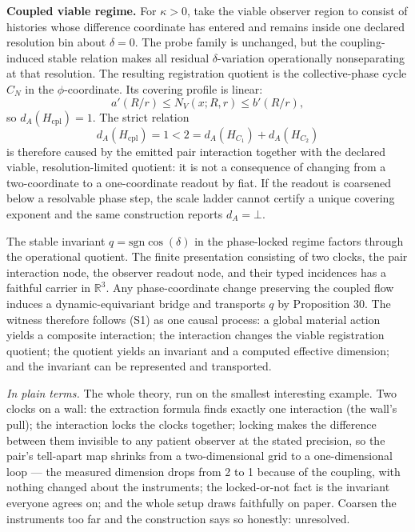 \documentclass[11pt]{article}
\theoremstyle{definition}
\newcommand{\plainterms}{\emph{In plain terms.}}
\begin{document}
\noindent\textbf{Coupled viable regime.} For $\kappa > 0$, take the viable observer region to consist of histories whose difference coordinate has entered and remains inside one declared resolution bin about $\delta = 0$. The probe family is unchanged, but the coupling-induced stable relation makes all residual $\delta$-variation operationally nonseparating at that resolution. The resulting registration quotient is the collective-phase cycle $C_N$ in the $\phi$-coordinate. Its covering profile is linear:
\begin{equation}
a'(R/r) \leq N_V(x; R, r) \leq b'(R/r), \tag{S27}
\end{equation}
so $d_A(H_{\mathrm{cpl}}) = 1$. The strict relation
\begin{equation}
d_A(H_{\mathrm{cpl}}) = 1 < 2 = d_A(H_{C_1}) + d_A(H_{C_2}) \tag{S28}
\end{equation}
is therefore caused by the emitted pair interaction together with the declared viable, resolution-limited quotient: it is not a consequence of changing from a two-coordinate to a one-coordinate readout by fiat. If the readout is coarsened below a resolvable phase step, the scale ladder cannot certify a unique covering exponent and the same construction reports $d_A = \bot$.

The stable invariant $q = \mathrm{sgn}\cos(\delta)$ in the phase-locked regime factors through the operational quotient. The finite presentation consisting of two clocks, the pair interaction node, the observer readout node, and their typed incidences has a faithful carrier in $\mathbb{R}^3$. Any phase-coordinate change preserving the coupled flow induces a dynamic-equivariant bridge and transports $q$ by Proposition 30. The witness therefore follows (S1) as one causal process: a global material action yields a composite interaction; the interaction changes the viable registration quotient; the quotient yields an invariant and a computed effective dimension; and the invariant can be represented and transported.

\noindent\plainterms{} The whole theory, run on the smallest interesting example. Two clocks on a wall: the extraction formula finds exactly one interaction (the wall's pull); the interaction locks the clocks together; locking makes the difference between them invisible to any patient observer at the stated precision, so the pair's tell-apart map shrinks from a two-dimensional grid to a one-dimensional loop --- the measured dimension drops from 2 to 1 because of the coupling, with nothing changed about the instruments; the locked-or-not fact is the invariant everyone agrees on; and the whole setup draws faithfully on paper. Coarsen the instruments too far and the construction says so honestly: unresolved.
\end{document}
